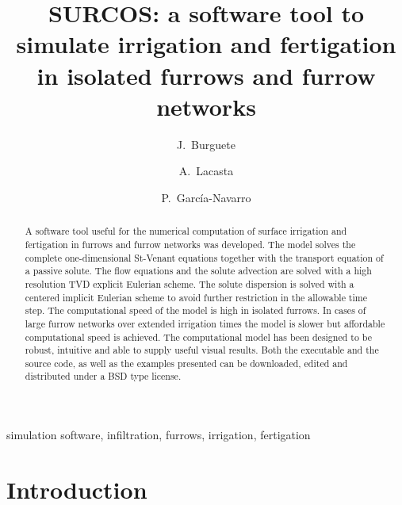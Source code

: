 \documentclass[review,authoryear]{elsarticle}
\begin{document}
\title
{
	SURCOS: a software tool to simulate irrigation and fertigation in isolated 
	furrows and furrow networks
}

\author[rvt1,rvt3]{J.~Burguete}

\author[rvt2]{A.~Lacasta}

\author[rvt2]{P.~García-Navarro}

\address[rvt1]{Soil and Water, EEAD / CSIC.
P.O. Box 13034, 50080~Zaragoza, Spain.}
\address[rvt2]{Fluid Mechanics, LIFTEC, Universidad de Zaragoza.
María de Luna 3, 50018~Zaragoza, Spain.}
\address[rvt3]{BIFI: Instituto de Biocomputación y Física de Sistemas Complejos,
Universidad de Zaragoza.
Mariano Esquillor, Edificio I+D, 50009~Zaragoza, Spain.}

\begin{keyword}
simulation software, infiltration, furrows, irrigation, fertigation
\end{keyword}

\begin{abstract}
A software tool useful for the numerical computation of surface irrigation and
fertigation in furrows and furrow networks was developed. The model solves the
complete one-dimensional St-Venant equations together with the transport
equation of a passive solute. The flow equations and the solute advection are
solved with a high resolution TVD explicit Eulerian scheme. The solute
dispersion is solved with a centered implicit Eulerian scheme to avoid further
restriction in the allowable time step. The computational speed of the model is
high in isolated furrows. In cases of large furrow networks over extended
irrigation times the model is slower but affordable computational speed is
achieved. The computational model has been designed to be robust, intuitive and
able to supply useful visual results. Both the executable and the source code,
as well as the examples presented can be downloaded, edited and distributed
under a BSD type license.
\end{abstract}

\maketitle

\section{Introduction}
\end{document}

